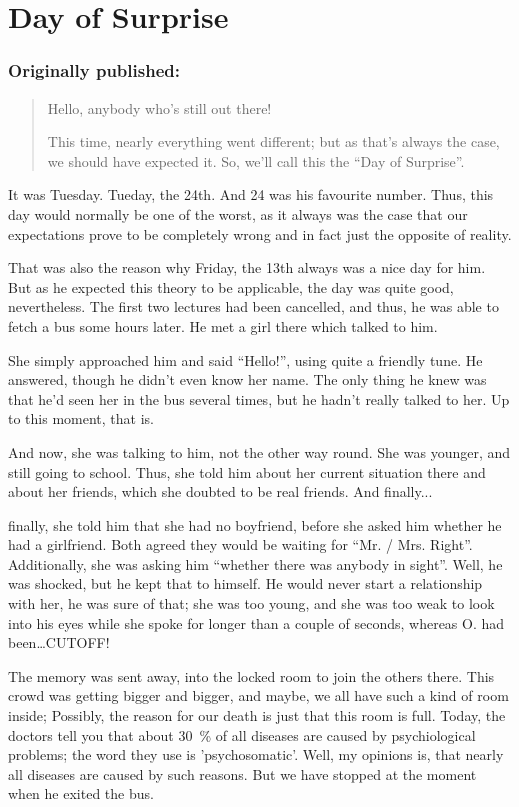 \chapter{Day of Surprise}
\label{cha:day-surprise}
\subsection*{Originally published: }
\begin{quote}
Hello, anybody who's still out there!

This time, nearly everything went different; but as that's always the case, we should have expected it. So, we'll call this the \enquote{Day of Surprise}. 
\end{quote}

It was Tuesday. Tueday, the 24th. And 24 was his favourite number. Thus, this day would normally be one of the worst, as it always was the case that our expectations prove to be completely wrong and in fact just the opposite of reality.

That was also the reason why Friday, the 13th always was a nice day for him. 
But as he expected this theory to be applicable, the day was quite good, nevertheless. 
The first two lectures had been cancelled, and thus, he was able to fetch a bus some hours later. 
He met a girl there which talked to him.

She simply approached him and said \enquote{Hello!}, using quite a friendly tune. 
He answered, though he didn't even know her name. The only thing he knew was that he'd seen her in the bus several times, but he hadn't really talked to her. 
Up to this moment, that is.

And now, she was talking to him, not the other way round. 
She was younger, and still going to school. Thus, she told him about her current situation there and about her friends, which she doubted to be real friends. 
And finally...

finally, she told him that she had no boyfriend, before she asked him whether he had a girlfriend. 
Both agreed they would be waiting for \enquote{Mr. / Mrs. Right}. Additionally, she was asking him \enquote{whether there was anybody in sight}. 
Well, he was shocked, but he kept that to himself. 
He would never start a relationship with her, he was sure of that; she was too young, and she was too weak to look into his eyes while she spoke for longer than a couple of seconds, whereas O. had been\ldots CUTOFF!

The memory was sent away, into the locked room to join the others there. 
This crowd was getting bigger and bigger, and maybe, we all have such a kind of room inside; Possibly, the reason for our death is just that this room is full. 
Today, the doctors tell you that about \SI{30}{\percent} of all diseases are caused by psychiological problems; the word they use is 'psychosomatic'. 
Well, my opinions is, that nearly all diseases are caused by such reasons. 
But we have stopped at the moment when he exited the bus.

